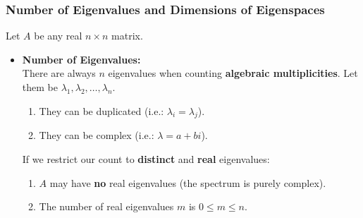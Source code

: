 \documentclass[11pt]{article}
\newcommand{\mymat}[1]{#1}
\begin{document}
    \subsubsection{Number of Eigenvalues and Dimensions of Eigenspaces}
    Let $\mymat{A}$ be any real $n \times n$ matrix.
    \begin{itemize}
        \item \textbf{Number of Eigenvalues:} \vspace{1ex} \\
            There are always $n$ eigenvalues when counting \textbf{algebraic multiplicities}. Let them be $\lambda_1, \lambda_2, \dots, \lambda_n$.
            \begin{enumerate}
                \item They can be duplicated (i.e.: $\lambda_i = \lambda_j$).
                \item They can be complex (i.e.: $\lambda = a + bi$).
            \end{enumerate} \vspace{1ex}
            If we restrict our count to \textbf{distinct} and \textbf{real} eigenvalues:
            \begin{enumerate}
                \item $\mymat{A}$ may have \textbf{no} real eigenvalues (the spectrum is purely complex).
                \item The number of real eigenvalues $m$ is $0 \le m \le n$.
            \end{enumerate}


\end{itemize}
\end{document}
